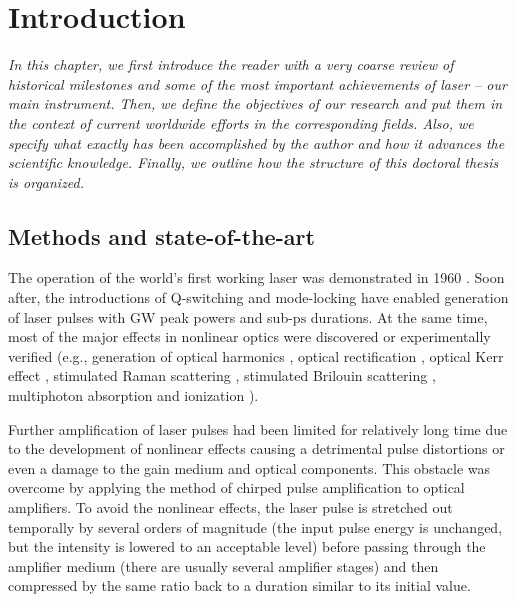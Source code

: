 \documentclass[10pt, a4paper, twoside, openright]{report}
\begin{document}
\chapter{Introduction}
%

\noindent \textsl{In this chapter, we first introduce the reader with a very coarse review of historical milestones and some of the most important achievements of laser -- our main instrument. Then, we define the objectives of our research and put them in the context of current worldwide efforts in the corresponding fields. Also, we specify what exactly has been accomplished by the author and how it advances the scientific knowledge. Finally, we outline how the structure of this doctoral thesis is organized.}


\section{Methods and state-of-the-art}

The operation of the world's first working laser was demonstrated in 1960 \cite{Maiman1960}. Soon after, the introductions of Q-switching \cite{McClung1962} and mode-locking \cite{Mocker1965} have enabled generation of laser pulses with GW peak powers and sub-$ \mathrm{ps} $ durations. At the same time, most of the major effects in nonlinear optics were discovered or experimentally verified (e.g., generation of optical harmonics \cite{Franken1961}, optical rectification \cite{Bass1962}, optical Kerr effect \cite{Armstrong1962, Maker1964}, stimulated Raman scattering \cite{Woodbury1962}, stimulated Brilouin scattering \cite{Chiao1964b, Chiao1964}, multiphoton absorption and ionization \cite{Kaiser1961, Voronov1966}). 

Further amplification of laser pulses had been limited for relatively long time due to the development of nonlinear effects causing a detrimental pulse distortions or even a damage to the gain medium and optical components. This obstacle was overcome by applying the method of chirped pulse amplification \cite{Strickland1985, Maine1988} to optical amplifiers. To avoid the nonlinear effects, the laser pulse is stretched out temporally by several orders of magnitude (the input pulse energy is unchanged, but the intensity is lowered to an acceptable level) before passing through the amplifier medium (there are usually several amplifier stages) and then compressed by the same ratio back to a duration similar to its initial value.
\end{document}

